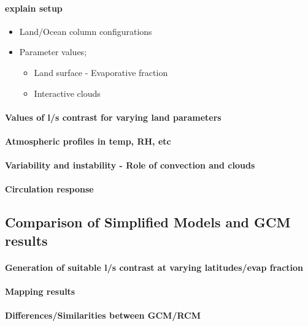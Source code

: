 \paragraph{explain setup}
\begin{itemize}
	\item Land/Ocean column configurations
	\item Parameter values;
		\begin{itemize}
			\item Land surface - Evaporative fraction
			\item Interactive clouds
		\end{itemize}
\end{itemize}

\paragraph{Values of l/s contrast for varying land parameters}
\paragraph{Atmospheric profiles in temp, RH, etc}
\paragraph{Variability and instability - Role of convection and clouds}
\paragraph{Circulation response}

\subsection{Comparison of Simplified Models and GCM results}

\paragraph{Generation of suitable l/s contrast at varying latitudes/evap fraction}
\paragraph{Mapping results}
\paragraph{Differences/Similarities between GCM/RCM}



